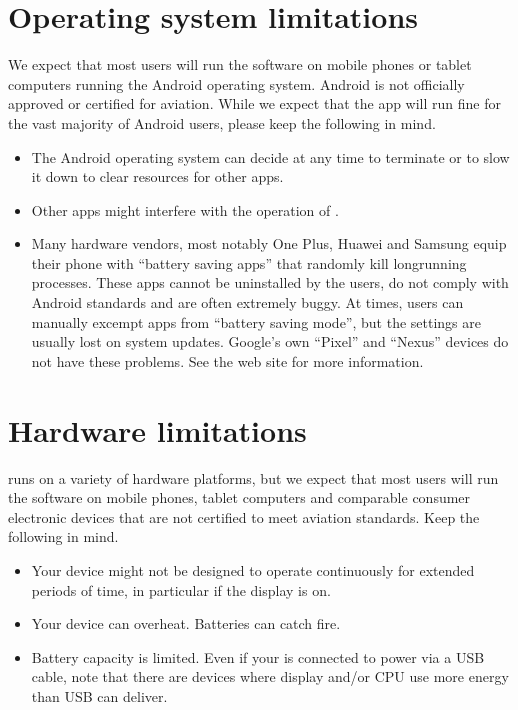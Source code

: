 \documentclass[letterpaper,10pt,english]{sphinxmanual}
\begin{document}
\section{Operating system limitations}
\label{\detokenize{01-intro/think:operating-system-limitations}}
\sphinxAtStartPar
We expect that most users will run the software on mobile phones or tablet
computers running the Android operating system.  Android is not officially
approved or certified for aviation.  While we expect that the app will run fine
for the vast majority of Android users, please keep the following in mind.
\begin{itemize}
\item {} 
\sphinxAtStartPar
The Android operating system can decide at any time to terminate  or to slow it down to clear resources for other apps.

\item {} 
\sphinxAtStartPar
Other apps might interfere with the operation of .

\item {} 
\sphinxAtStartPar
Many hardware vendors, most notably One Plus, Huawei and Samsung equip their
phone with “battery saving apps” that randomly kill long\sphinxhyphen{}running processes.
These apps cannot be uninstalled by the users, do not comply with Android
standards and are often extremely buggy.  At times, users can manually excempt
apps from “battery saving mode”, but the settings are usually lost on system
updates.  Google’s own “Pixel” and “Nexus” devices do not have these problems.
See the web site  for more
information.

\end{itemize}


\section{Hardware limitations}
\label{\detokenize{01-intro/think:hardware-limitations}}
\sphinxAtStartPar
{} runs on a variety of hardware platforms, but we
expect that most users will run the software on mobile phones, tablet computers
and comparable consumer electronic devices that are not certified to meet
aviation standards.  Keep the following in mind.
\begin{itemize}
\item {} 
\sphinxAtStartPar
Your device might not be designed to operate continuously for extended periods
of time, in particular if the display is on.

\item {} 
\sphinxAtStartPar
Your device can overheat. Batteries can catch fire.

\item {} 
\sphinxAtStartPar
Battery capacity is limited.  Even if your is connected to power via a USB
cable, note that there are devices where display and/or CPU use more energy
than USB can deliver.

\end{itemize}
\end{document}
